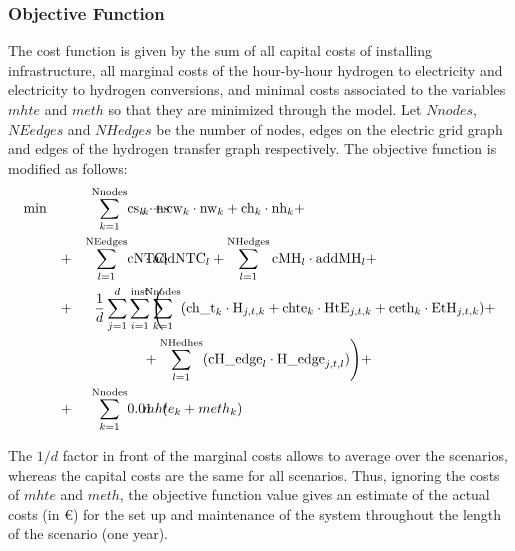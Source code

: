 
\subsubsection{Objective Function}
The cost function is given by the sum of all capital costs of installing infrastructure, all marginal costs of the hour-by-hour hydrogen to electricity and electricity to hydrogen conversions, and minimal costs associated to the variables $mhte$ and $meth$ so that they are minimized through the model.
Let $Nnodes$, $NEedges$ and $NHedges$ be the number of nodes, edges on the electric grid graph and edges of the hydrogen transfer graph respectively. The objective function is modified as follows:
\begin{align*}
    \min \quad 
    &&\sum_{k=1}^{\text{Nnodes}}&\text{cs}_k \cdot \text{ns}\hspace{-3.5em}&&_k+\text{cw}_k \cdot \text{nw}_k + \text{ch}_k \cdot \text{nh}_k + \\
    &+& \sum_{l=1}^{\text{NEedges}}& \text{cNTC}_l \hspace{-3em}&&\cdot\text{addNTC}_l 
    + \sum_{l=1}^{\text{NHedges}} \text{cMH}_l\cdot \text{addMH}_l + \\   
    &+&\frac{1}{d}\sum_{j=1}^{d}&\sum_{i=1}^{\text{inst}} \Bigg( \hspace{-5em}&&
    \sum_{k=1}^{\text{Nnodes}} (\text{ch\_t}_k \cdot \text{H}_{j,t,k} + \text{chte}_k \cdot \text{HtE}_{j,t,k} + \text{ceth}_k \cdot \text{EtH}_{j,t,k}) + \\
    &&&\hspace{-2em}&&+\sum_{l=1}^{\text{NHedhes}} (\text{cH\_edge}_l\cdot\text{H\_edge}_{j,t,l}) \Bigg) + \\
    &+&\sum_{k=1}^{\text{Nnodes}}& 0.01\cdot(\hspace{-2.8em}&&mhte_k+meth_k)
\end{align*}

The $1/d$ factor in front of the marginal costs allows to average over the scenarios, whereas the capital costs are the same for all scenarios. Thus, ignoring the costs of $mhte$ and $meth$, the objective function value gives an estimate of the actual costs (in \euro) for the set up and maintenance of the system throughout the length of the scenario (one year). 


